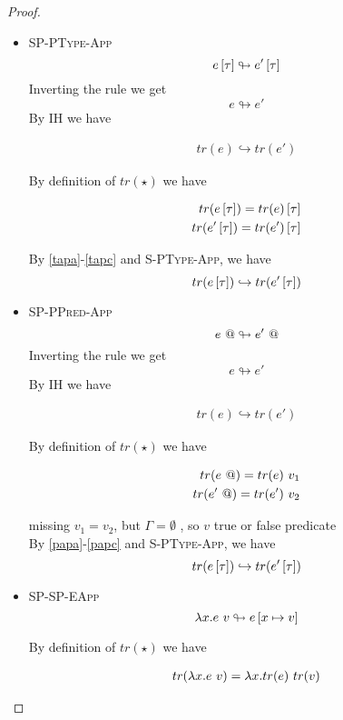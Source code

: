 \documentclass[10pt,a4paper]{article}
\newcommand\highlight[2]{{\setlength\fboxsep{1pt}\colorbox{#1}{#2}}}
\def\NV{\highlight{colorNV}}
\newcommand\trans[1]{\ensuremath{tr (#1)}}
\newcommand\rulename[1]{\textsc{#1}}
\newcommand\peval[2]{\ensuremath{#1 \looparrowright #2 }}
\newcommand\eval[2]{\ensuremath{#1 \hookrightarrow #2 }}
\begin{document}
\begin{proof}
\begin{itemize}
\item \rulename{SP-PType-App} $$\peval{\etapp{e}{\tau}}{\etapp{e'}{\tau}}$$
Inverting the rule we get $$\peval{e}{e'}$$ 
By IH we have 

\begin{align}
\eval{\trans{e}}{\trans{e'}} \label{tapa}
\end{align}

By definition of \trans{\star} we have 

\begin{align}
\trans{\etapp{e}{\tau}} = \etapp{\trans{e}}{\tau} \label{tapb}\\
\trans{\etapp{e'}{\tau}} = \etapp{\trans{e'}}{\tau} \label{tapc}
\end{align}

By \ref{tapa}-\ref{tapc} and \rulename{S-PType-App}, we have 
$$ \eval{\trans{\etapp{e}{\tau}}}{\trans{\etapp{e'}{\tau}}} \label{apla} $$

\item \rulename{SP-PPred-App} $$\peval{\epapp{e}}{\epapp{e'}}$$
Inverting the rule we get $$\peval{e}{e'}$$ 
By IH we have 

\begin{align}
\eval{\trans{e}}{\trans{e'}} \label{papa}
\end{align}

By definition of \trans{\star} we have 

\begin{align}
\trans{\epapp{e}} = \eapp{\trans{e}}v_1 \label{papb}\\
\trans{\epapp{e'}} = \eapp{\trans{e'}}v_2 \label{papc}
\end{align}

\NV{missing $v_1=v_2$, but $\Gamma=\emptyset$
, so $v$ true or false predicate}\\

By \ref{papa}-\ref{papc} and \rulename{S-PType-App}, we have 
$$ \eval{\trans{\etapp{e}{\tau}}}{\trans{\etapp{e'}{\tau}}} \label{apla} $$

\item \rulename{SP-SP-EApp} $$\peval{\eapp{\efun{x}{e}}{v}}{e\sub{x}{v}}$$

By definition of \trans{\star} we have 

\begin{align}
\trans{\eapp{\efun{x}{e}}{v}} = \eapp{\efun{x}{\trans{e}}}{\trans{v}} \label{appb}
\end{align}




\end{itemize}
\end{proof}
\end{document}
